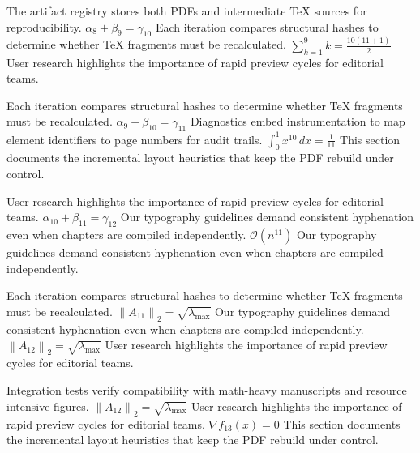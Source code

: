 \documentclass[12pt,a4paper,twocolumn]{article}
\newcommand{\paraid}[1]{\par\noindent\hypertarget{#1}{\ignorespaces}}
\begin{document}
\paraid{sec5-p3}The artifact registry stores both PDFs and intermediate TeX sources for reproducibility. $\alpha_{8} + \beta_{9} = \gamma_{10}$ Each iteration compares structural hashes to determine whether TeX fragments must be recalculated. $\sum_{k=1}^{9} k = \frac{10(11+1)}{2}$ User research highlights the importance of rapid preview cycles for editorial teams.
\par

\paraid{sec5-p4}Each iteration compares structural hashes to determine whether TeX fragments must be recalculated. $\alpha_{9} + \beta_{10} = \gamma_{11}$ Diagnostics embed instrumentation to map element identifiers to page numbers for audit trails. $\int_{0}^{1} x^{10} \, dx = \frac{1}{11}$ This section documents the incremental layout heuristics that keep the PDF rebuild under control.
\par

\paraid{sec5-p5}User research highlights the importance of rapid preview cycles for editorial teams. $\alpha_{10} + \beta_{11} = \gamma_{12}$ Our typography guidelines demand consistent hyphenation even when chapters are compiled independently. $\mathcal{O}(n^{11})$ Our typography guidelines demand consistent hyphenation even when chapters are compiled independently.
\par

\paraid{sec5-p6}Each iteration compares structural hashes to determine whether TeX fragments must be recalculated. $\left\|A_{11}\right\|_{2} = \sqrt{\lambda_{\max}}$ Our typography guidelines demand consistent hyphenation even when chapters are compiled independently. $\left\|A_{12}\right\|_{2} = \sqrt{\lambda_{\max}}$ User research highlights the importance of rapid preview cycles for editorial teams.
\par

\paraid{sec5-p7}Integration tests verify compatibility with math-heavy manuscripts and resource intensive figures. $\left\|A_{12}\right\|_{2} = \sqrt{\lambda_{\max}}$ User research highlights the importance of rapid preview cycles for editorial teams. $\nabla f_{13}(x) = 0$ This section documents the incremental layout heuristics that keep the PDF rebuild under control.
\par
\end{document}

